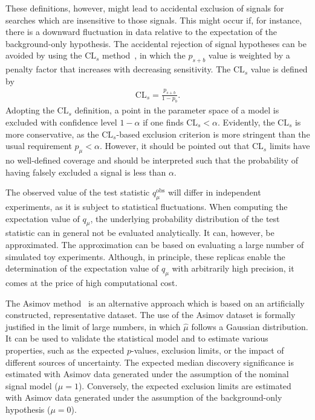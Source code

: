 These definitions, however, might lead to accidental exclusion of signals for searches which are insensitive to those signals. This might occur if, for instance, there is a downward fluctuation in data relative to the expectation of the background-only hypothesis.
The accidental rejection of signal hypotheses can be avoided by using the \(\text{CL}_{s}\) method~\cite{Read:2002hq}, in which the \(p_{s+b}\) value is weighted by a penalty factor that increases with decreasing sensitivity. The \(\text{CL}_{s}\) value is defined by
\begin{align}
    \text{CL}_{s} = \frac{p_{s+b}}{1 - p_{b}}.
\end{align}
Adopting the \(\text{CL}_{s}\) definition, a point in the parameter space of a model is excluded with confidence level \(1 - \alpha\) if one finds \(\text{CL}_{s} < \alpha\). Evidently, the \(\text{CL}_{s}\) is more conservative, as the \(\text{CL}_{s}\)-based exclusion criterion is more stringent than the usual requirement \(p_{\mu} < \alpha\).
However, it should be pointed out that \(\text{CL}_{s}\) limits have no well-defined coverage and should be interpreted such that the probability of having falsely excluded a signal is less than \(\alpha\).

The observed value of the test statistic \(q_{\mu}^{\text{obs}}\) will differ in independent experiments, as it is subject to statistical fluctuations. When computing the expectation value of \(q_{\mu}\), the underlying probability distribution of the test statistic can in general not be evaluated analytically. It can, however, be approximated.
The approximation can be based on evaluating a large number of simulated toy experiments. Although, in principle, these replicas enable the determination of the expectation value of \(q_{\mu}\) with arbitrarily high precision, it comes at the price of high computational cost.

The Asimov method~\cite{Cowan:2010js,Cowan:2010js-err} is an alternative approach which is based on an artificially constructed, representative dataset. The use of the Asimov dataset is formally justified in the limit of large numbers, in which \(\hat{\mu}\) follows a Gaussian distribution.
It can be used to validate the statistical model and to estimate various properties, such as the expected \(p\)-values, exclusion limits, or the impact of different sources of uncertainty.
The expected median discovery significance is estimated with Asimov data generated under the assumption of the nominal signal model (\(\mu=1\)). Conversely, the expected exclusion limits are estimated with Asimov data generated under the assumption of the background-only hypothesis (\(\mu=0\)).


